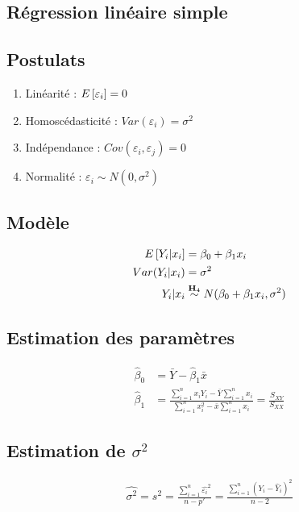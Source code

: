\documentclass[10pt, french]{article}
\begin{document}
\small
\begin{multicols*}{3} %
\section{Régression linéaire simple}
\subsection*{Postulats}
\begin{enumerate}[label=$\mathbf{H}_{\arabic*}$]
\item Linéarité : $E \left[ \varepsilon_i \right] = 0$
\item Homoscédasticité : $Var(\varepsilon_i)= \sigma^2$
\item Indépendance : $Cov(\varepsilon_i, \varepsilon_j) = 0$
\item Normalité : $\varepsilon_i \sim N(0, \sigma^2)$
\end{enumerate}
\subsection*{Modèle}
\begin{align*}
E \left[ Y_i | x_i \right] 	& = \beta_0 + \beta_1 x_i \\
Var(Y_i | x_i)	& = \sigma^2 \\
Y_i | x_i & \overset{\mathbf{H}_4}{\sim} N(\beta_0 + \beta_1 x_i, \sigma^2) \\
\end{align*}

\subsection*{Estimation des paramètres}
\begin{align*}
\hat{\beta}_0 	& = \bar{Y} - \hat{\beta}_1 \bar{x} \\
\hat{\beta}_1	& = \frac{\sum_{i=1}^{n} x_i Y_i - \bar{Y} \sum_{i=1}^{n} x_i}{\sum_{i=1}^{n} x_i^2 - \bar{x} \sum_{i=1}^{n} x_i} = \frac{S_{XY}}{S_{XX}}
\end{align*}

\subsection*{Estimation de $\sigma^2$}
\begin{align*}
\hat{\sigma^2} = s^2 = \frac{\sum_{i=1}^{n} \hat{\varepsilon_i}^2}{n-p'} = \frac{\sum_{i=1}^{n} (Y_i - \hat{Y}_i)^2}{n-2}
\end{align*}


\end{multicols*}
\end{document}
